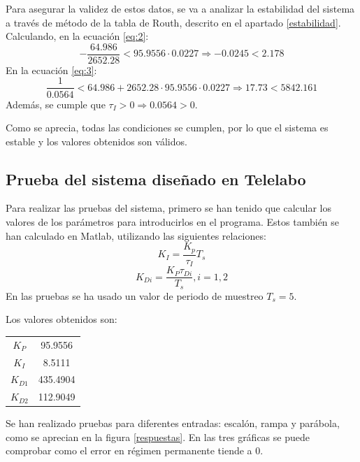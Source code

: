 \documentclass[a4paper]{article}
\begin{document}
Para asegurar la validez de estos datos, se va a analizar la estabilidad del sistema a través de método de la tabla de Routh, descrito en el apartado \ref{estabilidad}.
Calculando, en la ecuación \ref{eq:2}:
\begin{equation}
	-\frac{64.986}{2652.28}< 95.9556\cdot0.0227 \Rightarrow
	-0.0245<2.178
\end{equation}
En la ecuación \ref{eq:3}:
\begin{equation}
	\frac{1}{0.0564} < 64.986+2652.28\cdot95.9556\cdot0.0227 \Rightarrow
	17.73<5842.161
\end{equation}
Además, se cumple que $\tau_I > 0 \Rightarrow 0.0564>0$.

Como se aprecia, todas las condiciones se cumplen, por lo que el sistema es estable y los valores obtenidos son válidos.

\subsection{Prueba del sistema diseñado en Telelabo \label{sec:pruebas}}
Para realizar las pruebas del sistema, primero se han tenido que calcular los valores de los parámetros para introducirlos en el programa. Estos también se han calculado en Matlab, utilizando las siguientes relaciones:
\begin{equation}
K_I=\frac{K_p}{\tau_I} T_s
\end{equation}
\begin{equation}
K_{Di}=\frac{K_P \tau_{Di}}{T_s}, i=1,2
\end{equation}
En las pruebas se ha usado un valor de periodo de muestreo $T_s=5$.

Los valores obtenidos son:
\begin{center}
	\begin{tabular}{c|c}
		$K_P$ & 95.9556 \\
		$K_I$ & 8.5111 \\
		$K_{D1}$ & 435.4904 \\
		$K_{D2}$ & 112.9049 \\
	\end{tabular}
\end{center}

Se han realizado pruebas para diferentes entradas: escalón, rampa y parábola, como se aprecian en la figura \ref{respuestas}.
En las tres gráficas se puede comprobar como el error en régimen permanente tiende a $0$.
\end{document}

